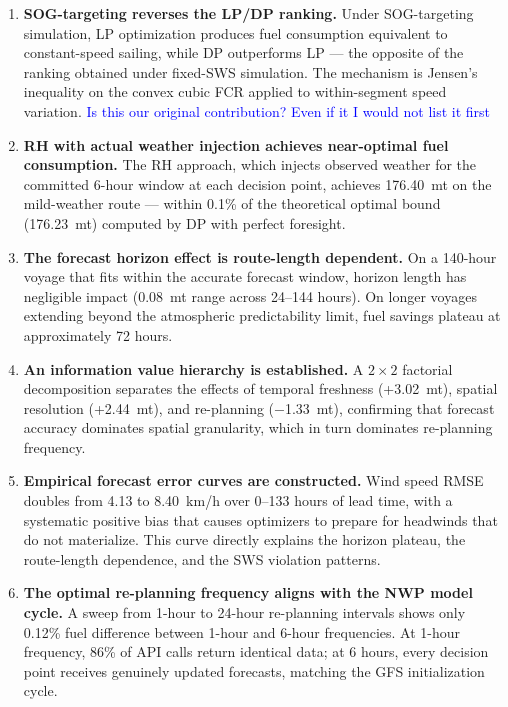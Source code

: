\documentclass[review,authoryear]{elsarticle}  %
\newcommand{\revadd}[1]{\textcolor{blue}{#1}}
\begin{document}
\begin{enumerate}  
    \item \textbf{SOG-targeting reverses the LP/DP ranking.} Under SOG-targeting simulation, LP optimization produces fuel consumption equivalent to constant-speed sailing, while DP outperforms LP --- the opposite of the ranking obtained under fixed-SWS simulation. The mechanism is Jensen's inequality on the convex cubic FCR applied to within-segment speed variation. \revadd{Is this our original contribution? Even if it I would not list it first}

    \item \textbf{RH with actual weather injection achieves near-optimal fuel consumption.} The RH approach, which injects observed weather for the committed 6-hour window at each decision point, achieves 176.40~mt on the mild-weather route --- within 0.1\% of the theoretical optimal bound (176.23~mt) computed by DP with perfect foresight.

    \item \textbf{The forecast horizon effect is route-length dependent.} On a 140-hour voyage that fits within the accurate forecast window, horizon length has negligible impact (0.08~mt range across 24--144 hours). On longer voyages extending beyond the atmospheric predictability limit, fuel savings plateau at approximately 72 hours.

    \item \textbf{An information value hierarchy is established.} A $2 \times 2$ factorial decomposition separates the effects of temporal freshness (+3.02~mt), spatial resolution (+2.44~mt), and re-planning ($-$1.33~mt), confirming that forecast accuracy dominates spatial granularity, which in turn dominates re-planning frequency.

    \item \textbf{Empirical forecast error curves are constructed.} Wind speed RMSE doubles from 4.13 to 8.40~km/h over 0--133 hours of lead time, with a systematic positive bias that causes optimizers to prepare for headwinds that do not materialize. This curve directly explains the horizon plateau, the route-length dependence, and the SWS violation patterns.

    \item \textbf{The optimal re-planning frequency aligns with the NWP model cycle.} A sweep from 1-hour to 24-hour re-planning intervals shows only 0.12\% fuel difference between 1-hour and 6-hour frequencies. At 1-hour frequency, 86\% of API calls return identical data; at 6 hours, every decision point receives genuinely updated forecasts, matching the GFS initialization cycle.
\end{enumerate}
\end{document}
